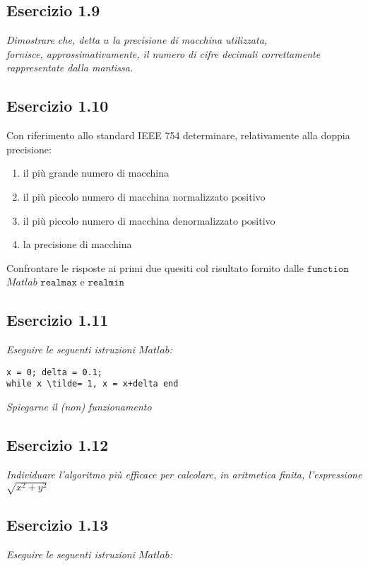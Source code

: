 \subsection{Esercizio 1.9}
\emph{Dimostrare che, detta $ u $ la precisione di macchina utilizzata, \\
\flushleft fornisce, approssimativamente, il numero di cifre decimali correttamente rappresentate dalla mantissa.}

\subsection{Esercizio 1.10}
Con riferimento allo standard IEEE 754 determinare, relativamente alla doppia precisione:\\ 
\begin{enumerate}
  	\item il più grande numero di macchina
  	\item il più piccolo numero di macchina normalizzato positivo
	\item il più piccolo numero di macchina denormalizzato positivo
	\item la precisione di macchina
\end{enumerate}
Confrontare le risposte ai primi due quesiti col risultato fornito dalle $\mathtt{function}$ $Matlab$ $\mathtt{realmax}$ e $\mathtt{realmin}$

\subsection{Esercizio 1.11}
\emph{Eseguire le seguenti istruzioni $Matlab$:}

\lstset{language=Matlab}
\begin{lstlisting}
x = 0; delta = 0.1;
while x \tilde= 1, x = x+delta end
\end{lstlisting}
\emph{Spiegarne il (non) funzionamento}

\subsection{Esercizio 1.12}
\emph{Individuare l'algoritmo più efficace per calcolare, in aritmetica finita, l'espressione $\sqrt{x^{2} + y^{2}}$}

\subsection{Esercizio 1.13}
\emph{Eseguire le seguenti istruzioni $Matlab$:}

